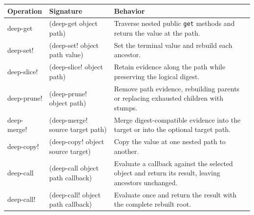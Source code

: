 \begin{tabularx}{\textwidth}{@{}>{\ttfamily\frenchspacing}P{0.125\textwidth}>{\ttfamily\frenchspacing}P{0.38\textwidth}X@{}}
\toprule
\normalfont\textbf{Operation} & \normalfont\textbf{Signature} & \textbf{Behavior} \\
\midrule
deep-get    & (deep-get object path) & Traverse nested public \texttt{get} methods and return the value at the path. \\
deep-set!   & (deep-set! object path value) & Set the terminal value and rebuild each ancestor. \\
deep-slice! & (deep-slice! object path) & Retain evidence along the path while preserving the logical digest. \\
deep-prune! & (deep-prune! object path) & Remove path evidence, rebuilding parents or replacing exhausted children with stumps. \\
deep-merge! & (deep-merge! source target path) & Merge digest-compatible evidence into the target or into the optional target path. \\
deep-copy!  & (deep-copy! object source target) & Copy the value at one nested path to another. \\
deep-call   & (deep-call object path callback) & Evaluate a callback against the selected object and return its result, leaving ancestors unchanged. \\
deep-call!  & (deep-call! object path callback) & Evaluate once and return the result with the complete rebuilt root. \\
\bottomrule
\end{tabularx}
